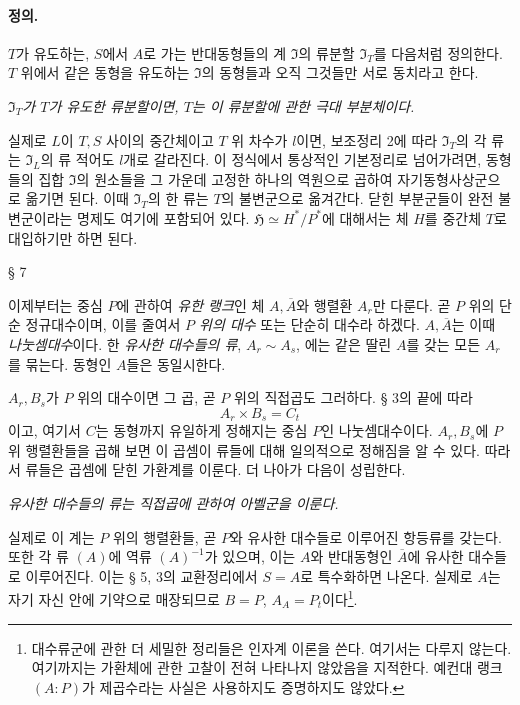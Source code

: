 \paragraph{정의.}
\(T\)가 유도하는, \(S\)에서 \(A\)로 가는 반대동형들의 계 \(\mathfrak I\)의 류분할 \(\mathfrak I_T\)를 다음처럼 정의한다. \(T\) 위에서 같은 동형을 유도하는 \(\mathfrak I\)의 동형들과 오직 그것들만 서로 동치라고 한다.

\noindent\textbf{} \emph{\(\mathfrak I_T\)가 \(T\)가 유도한 류분할이면, \(T\)는 이 류분할에 관한 극대 부분체이다.}

실제로 \(L\)이 \(T,S\) 사이의 중간체이고 \(T\) 위 차수가 \(l\)이면, 보조정리 2에 따라 \(\mathfrak I_T\)의 각 류는 \(\mathfrak I_L\)의 류 적어도 \(l\)개로 갈라진다. 이 정식에서 통상적인 기본정리로 넘어가려면, 동형들의 집합 \(\mathfrak I\)의 원소들을 그 가운데 고정한 하나의 역원으로 곱하여 자기동형사상군으로 옮기면 된다. 이때 \(\mathfrak I_T\)의 한 류는 \(T\)의 불변군으로 옮겨간다. 닫힌 부분군들이 완전 불변군이라는 명제도 여기에 포함되어 있다. \(\mathfrak H\simeq H^*/P^*\)에 대해서는 체 \(H\)를 중간체 \(T\)로 대입하기만 하면 된다.

\begin{center}
§ 7

\textbf{}
\end{center}

이제부터는 중심 \(P\)에 관하여 \emph{유한 랭크}인 체 \(A,\overline A\)와 행렬환 \(A_r\)만 다룬다. 곧 \(P\) 위의 단순 정규대수이며, 이를 줄여서 \emph{\(P\) 위의 대수} 또는 단순히 대수라 하겠다. \(A,\overline A\)는 이때 \emph{나눗셈대수}이다. 한 \emph{유사한 대수들의 류}, \(A_r\sim A_s\), 에는 같은 딸린 \(A\)를 갖는 모든 \(A_r\)를 묶는다. 동형인 \(A\)들은 동일시한다.

\noindent\textbf{} \(A_r,B_s\)가 \(P\) 위의 대수이면 그 곱, 곧 \(P\) 위의 직접곱도 그러하다. § 3의 끝에 따라
\[
A_r\times B_s=C_t
\]
이고, 여기서 \(C\)는 동형까지 유일하게 정해지는 중심 \(P\)인 나눗셈대수이다. \(A_r,B_s\)에 \(P\) 위 행렬환들을 곱해 보면 이 곱셈이 류들에 대해 일의적으로 정해짐을 알 수 있다. 따라서 류들은 곱셈에 닫힌 가환계를 이룬다. 더 나아가 다음이 성립한다.

\noindent\textbf{} \emph{유사한 대수들의 류는 직접곱에 관하여 아벨군을 이룬다.}

실제로 이 계는 \(P\) 위의 행렬환들, 곧 \(P\)와 유사한 대수들로 이루어진 항등류를 갖는다. 또한 각 류 \((A)\)에 역류 \((A)^{-1}\)가 있으며, 이는 \(A\)와 반대동형인 \(\overline A\)에 유사한 대수들로 이루어진다. 이는 § 5, 3의 교환정리에서 \(S=A\)로 특수화하면 나온다. 실제로 \(A\)는 자기 자신 안에 기약으로 매장되므로 \(B=P\), \(A_A=P_t\)이다\footnote{대수류군에 관한 더 세밀한 정리들은 인자계 이론을 쓴다. 여기서는 다루지 않는다. 여기까지는 가환체에 관한 고찰이 전혀 나타나지 않았음을 지적한다. 예컨대 랭크 \((A:P)\)가 제곱수라는 사실은 사용하지도 증명하지도 않았다.}.

